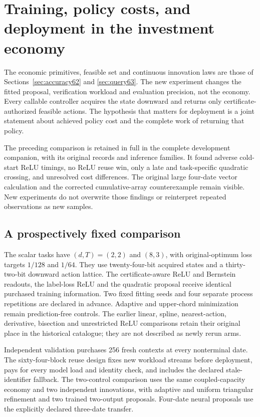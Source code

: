 \section{Training, policy costs, and deployment in the investment economy}\label{sec:study69}
The economic primitives, feasible set and continuous innovation laws are those of Sections~\ref{sec:accuracy62} and \ref{sec:query63}. The new experiment changes the fitted proposal, verification workload and evaluation precision, not the economy. Every callable controller acquires the state downward and returns only certificate-authorized feasible actions. The hypothesis that matters for deployment is a joint statement about achieved policy cost and the complete work of returning that policy.

The preceding comparison is retained in full in the complete development companion, with its original records and inference families. It found adverse cold-start ReLU timings, no ReLU reuse win, only a late and task-specific quadratic crossing, and unresolved cost differences. The original large four-date vector calculation and the corrected cumulative-array counterexample remain visible. New experiments do not overwrite those findings or reinterpret repeated observations as new samples.

\subsection{A prospectively fixed comparison}
The scalar tasks have $(d,T)=(2,2)$ and $(8,3)$, with original-optimum loss targets $1/128$ and $1/64$. They use twenty-four-bit acquired states and a thirty-two-bit downward action lattice. The certificate-aware ReLU and Bernstein readouts, the label-loss ReLU and the quadratic proposal receive identical purchased training information. Two fixed fitting seeds and four separate process repetitions are declared in advance. Adaptive and upper-chord minimization remain prediction-free controls. The earlier linear, spline, nearest-action, derivative, bisection and unrestricted ReLU comparisons retain their original place in the historical catalogue; they are not described as newly rerun arms.

Independent validation purchases 256 fresh contexts at every nonterminal date. The sixty-four-block reuse design fixes new workload streams before deployment, pays for every model load and identity check, and includes the declared stale-identifier fallback. The two-control comparison uses the same coupled-capacity economy and two independent innovations, with adaptive and uniform triangular refinement and two trained two-output proposals. Four-date neural proposals use the explicitly declared three-date transfer.

